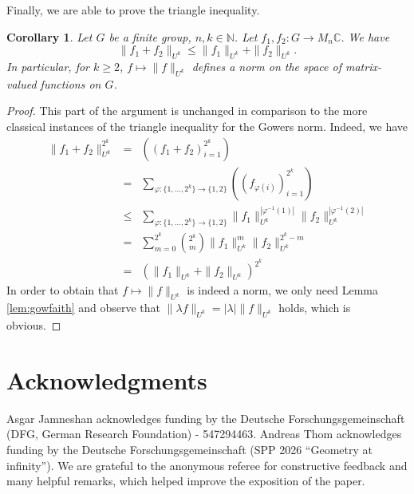 \documentclass[a4paper,11pt]{amsproc}
\theoremstyle{plain}
\newtheorem{corollary}[theorem]{Corollary}
\theoremstyle{definition}
\begin{document}
Finally, we are able to prove the triangle inequality.
\begin{corollary}
Let $G$ be a finite group, $n,k \in \mathbb N$. Let $f_1,f_2 \colon G \to M_n \mathbb C$. We have
$$\|f_1 + f_2\|_{U^k} \leq \|f_1\|_{U^k} + \| f_2\|_{U^k}.$$
In particular, for $k \geq 2$, $f \mapsto \|f\|_{U^k}$ defines a norm on the space of matrix-valued functions on $G$.
\end{corollary}
\begin{proof}
This part of the argument is unchanged in comparison to the more classical instances of the triangle inequality for the Gowers norm. Indeed, we have
\begin{eqnarray*}
\|f_1+f_2\|^{2^k}_{U^k} &=& ((f_1+f_2)_{i=1}^{2^k}) \\
&=& \sum_{\varphi \colon \{1,\dots,2^k\} \to \{1,2\}} ((f_{\varphi(i)})_{i=1}^{2^k}) \\
& \leq& \sum_{\varphi \colon \{1,\dots,2^k\} \to \{1,2\}} 
 \|f_1\|^{|\varphi^{-1}(1)|}_{U^k} \|f_2\|^{|\varphi^{-1}(2)|}_{U^k} \\
&=& \sum_{m=0}^{2^k} \binom{2^k}{m} \|f_1\|_{U^k}^m \|f_2\|_{U^k}^{2^k-m} \\
&=& (\|f_1\|_{U^k} + \|f_2\|_{U^k})^{2^k} 
\end{eqnarray*}
In order to obtain that $f \mapsto \|f\|_{U^k}$ is indeed a norm, we only need Lemma \ref{lem:gowfaith} and observe that $\|\lambda f\|_{U^k} = |\lambda| \|f\|_{U^k}$ holds, which is obvious.
\end{proof}


\section*{Acknowledgments}
Asgar Jamneshan acknowledges funding by the Deutsche Forschungsgemeinschaft (DFG, German Research Foundation) - 547294463. 
Andreas Thom acknowledges funding by the Deutsche Forschungsgemeinschaft (SPP 2026 ``Geometry at infinity''). We are grateful to the anonymous referee for constructive feedback and many helpful remarks, which helped improve the exposition of the paper.  
\end{document}
